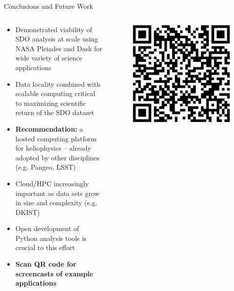 \documentclass[final,12pt]{beamer}
\newlength{\colwidth}
\begin{document}
\begin{frame}[fragile,t]
\begin{columns}[T]
\begin{column}{\colwidth}
  \begin{block}{Conclusions and Future Work}
    \begin{columns}
    \begin{column}{0.75\columnwidth}
      \begin{itemize}
        \item Demonstrated viability of SDO analysis at scale using NASA Pleiades and Dask for wide variety of science applications
        \item Data locality combined with scalable computing \alert{critical to maximizing scientific return of the SDO dataset}
        \item \textbf{\alert{Recommendation:}} a hosted computing platform for heliophysics -- already adopted by other disciplines (e.g. Pangeo, LSST)
        \item Cloud/HPC increasingly important as data sets grow in size and complexity (e.g. DKIST)
        \item \alert{Open development of Python analysis tools is crucial to this effort} 
        \item \textbf{Scan QR code for screencasts of example applications}
      \end{itemize}
    \end{column}
    \begin{column}{0.25\columnwidth}
      \begin{figure}
        \centering
        \includegraphics[width=\columnwidth]{figures/qr-code.eps}
      \end{figure}
    \end{column}
    \end{columns}
  \end{block}


\end{column}
\end{columns}
\end{frame}
\end{document}
